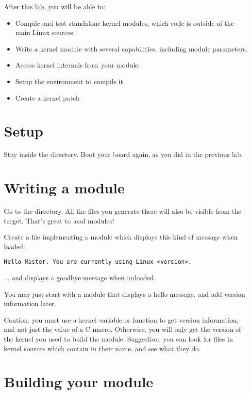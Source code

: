 
After this lab, you will be able to:

\begin{itemize}
\item Compile and test standalone kernel modules, which code is outside of the main Linux sources.
\item Write a kernel module with several capabilities, including module parameters.
\item Access kernel internals from your module.
\item Setup the environment to compile it
\item Create a kernel patch
\end{itemize}

\section{Setup}

Stay inside the  directory.
Boot your board again, as you did in the previous lab.

\section{Writing a module}

Go to the  directory. All the files you generate
there will also be visible from the target. That's great to load
modules!

Create a  file implementing a module which
displays this kind of message when loaded:

\begin{verbatim}
Hello Master. You are currently using Linux <version>.
\end{verbatim}

... and displays a goodbye message when unloaded.

You may just start with a module that displays a hello message, and
add version information later.

Caution: you must use a kernel variable or function to get version
information, and not just the value of a C macro. Otherwise, you will
only get the version of the kernel you used to build the
module. Suggestion: you can look for files in kernel sources which
contain  in their name, and see what they do.

\section{Building your module}


